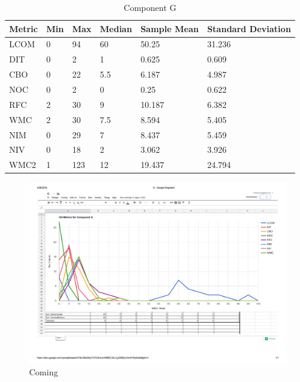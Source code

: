 \begin{table}[]
\centering
\caption{Component G}
\label{tab:oometrics-guri}
\begin{tabular}{|l|l|l|l|l|l|}
\hline
\textbf{Metric} & \textbf{Min} & \textbf{Max} & \textbf{Median} & \textbf{Sample Mean} & \textbf{Standard Deviation} \\ \hline
LCOM            & 0            & 94           & 60              & 50.25                & 31.236                      \\ \hline
DIT             & 0            & 2            & 1               & 0.625                & 0.609                       \\ \hline
CBO             & 0            & 22           & 5.5             & 6.187                & 4.987                       \\ \hline
NOC             & 0            & 2            & 0               & 0.25                 & 0.622                       \\ \hline
RFC             & 2            & 30           & 9               & 10.187               & 6.382                       \\ \hline
WMC             & 2            & 30           & 7.5             & 8.594                & 5.405                       \\ \hline
NIM             & 0            & 29           & 7               & 8.437                & 5.459                       \\ \hline
NIV             & 0            & 18           & 2               & 3.062                & 3.926                       \\ \hline
WMC2            & 1            & 123          & 12              & 19.437                 & 24.794                      \\ \hline
\end{tabular}
\end{table}

\begin{landscape}
\setlength\LTleft{-.5in}
	\begin{figure}
	\label{fig:gurigraph}
	\caption{Coming}
	\centering
	\includegraphics[width=\textwidth]{images/guri.pdf}
	\end{figure}
\end{landscape}





